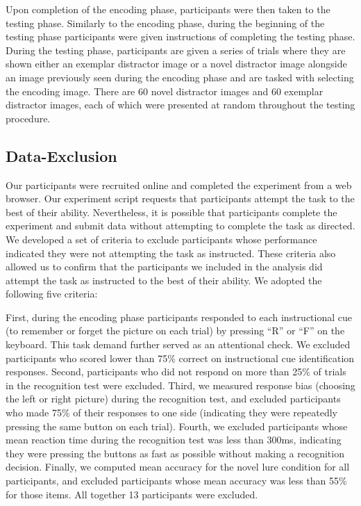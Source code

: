 \documentclass[
  english,
  man,floatsintext]{apa6}
\begin{document}
Upon completion of the encoding phase, participants were then taken to the testing phase. Similarly to the encoding phase, during the beginning of the testing phase participants were given instructions of completing the testing phase. During the testing phase, participants are given a series of trials where they are shown either an exemplar distractor image or a novel distractor image alongside an image previously seen during the encoding phase and are tasked with selecting the encoding image. There are 60 novel distractor images and 60 exemplar distractor images, each of which were presented at random throughout the testing procedure.

\hypertarget{data-exclusion}{%
\subsection{Data-Exclusion}\label{data-exclusion}}

Our participants were recruited online and completed the experiment from a web browser. Our experiment script requests that participants attempt the task to the best of their ability. Nevertheless, it is possible that participants complete the experiment and submit data without attempting to complete the task as directed. We developed a set of criteria to exclude participants whose performance indicated they were not attempting the task as instructed. These criteria also allowed us to confirm that the participants we included in the analysis did attempt the task as instructed to the best of their ability. We adopted the following five criteria:

First, during the encoding phase participants responded to each instructional cue (to remember or forget the picture on each trial) by pressing \enquote{R} or \enquote{F} on the keyboard. This task demand further served as an attentional check. We excluded participants who scored lower than 75\% correct on instructional cue identification responses. Second, participants who did not respond on more than 25\% of trials in the recognition test were excluded. Third, we measured response bias (choosing the left or right picture) during the recognition test, and excluded participants who made 75\% of their responses to one side (indicating they were repeatedly pressing the same button on each trial). Fourth, we excluded participants whose mean reaction time during the recognition test was less than 300ms, indicating they were pressing the buttons as fast as possible without making a recognition decision. Finally, we computed mean accuracy for the novel lure condition for all participants, and excluded participants whose mean accuracy was less than 55\% for those items. All together 13 participants were excluded.
\end{document}

